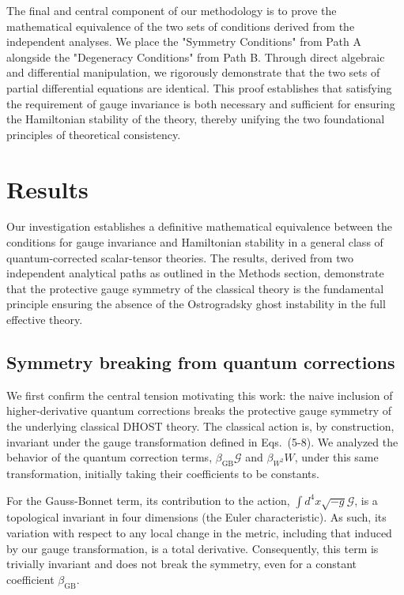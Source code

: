 \documentclass[twocolumn]{aastex631}
\begin{document}
The final and central component of our methodology is to prove the mathematical equivalence of the two sets of conditions derived from the independent analyses. We place the "Symmetry Conditions" from Path A alongside the "Degeneracy Conditions" from Path B. Through direct algebraic and differential manipulation, we rigorously demonstrate that the two sets of partial differential equations are identical. This proof establishes that satisfying the requirement of gauge invariance is both necessary and sufficient for ensuring the Hamiltonian stability of the theory, thereby unifying the two foundational principles of theoretical consistency.

\section{Results}
\label{sec:results}
Our investigation establishes a definitive mathematical equivalence between the conditions for gauge invariance and Hamiltonian stability in a general class of quantum-corrected scalar-tensor theories. The results, derived from two independent analytical paths as outlined in the Methods section, demonstrate that the protective gauge symmetry of the classical theory is the fundamental principle ensuring the absence of the Ostrogradsky ghost instability in the full effective theory.

\subsection{Symmetry breaking from quantum corrections}

We first confirm the central tension motivating this work: the naive inclusion of higher-derivative quantum corrections breaks the protective gauge symmetry of the underlying classical DHOST theory. The classical action is, by construction, invariant under the gauge transformation defined in Eqs.~(5-8). We analyzed the behavior of the quantum correction terms, $\beta_{\text{GB}}\mathcal{G}$ and $\beta_{W^2}W$, under this same transformation, initially taking their coefficients to be constants.

For the Gauss-Bonnet term, its contribution to the action, $\int d^4x \sqrt{-g} \mathcal{G}$, is a topological invariant in four dimensions (the Euler characteristic). As such, its variation with respect to any local change in the metric, including that induced by our gauge transformation, is a total derivative. Consequently, this term is trivially invariant and does not break the symmetry, even for a constant coefficient $\beta_{\text{GB}}$.
\end{document}
